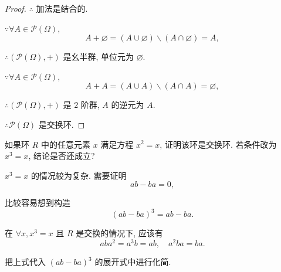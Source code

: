 \documentclass[color=black,device=normal,lang=cn,mode=geye]{elegantnote}
\begin{document}
\begin{proof}
    $\therefore$ 加法是结合的.

    $\because\forall A\in\mathcal{P}(\Omega)$,
    \[A+\varnothing=(A\cup\varnothing)\backslash(A\cap\varnothing)=A,\]

    $\therefore(\mathcal{P}(\Omega),+)$ 是幺半群, 单位元为 $\varnothing$.

    $\because\forall A\in\mathcal{P}(\Omega)$,
    \[A+A=(A\cup A)\backslash(A\cap A)=\varnothing,\]

    $\therefore(\mathcal{P}(\Omega),+)$ 是 $2$ 阶群, $A$ 的逆元为 $A$.

    $\therefore\mathcal{P}(\Omega)$ 是交换环.
\end{proof}
\begin{exercise}%
    如果环 $R$ 中的任意元素 $x$ 满足方程 $x^2=x$, 证明该环是交换环. 若条件改为 $x^3=x$, 结论是否还成立?
\end{exercise}
\begin{thought}
    $x^3=x$ 的情况较为复杂. 需要证明
    \[ab-ba=0,\]

    比较容易想到构造
    \[(ab-ba)^3=ab-ba.\]

    在 $\forall x,x^3=x$ 且 $R$ 是交换的情况下, 应该有
    \[aba^2=a^3b=ab,\quad a^2ba=ba.\]

    把上式代入 $(ab-ba)^3$ 的展开式中进行化简.
\end{thought}
\end{document}
